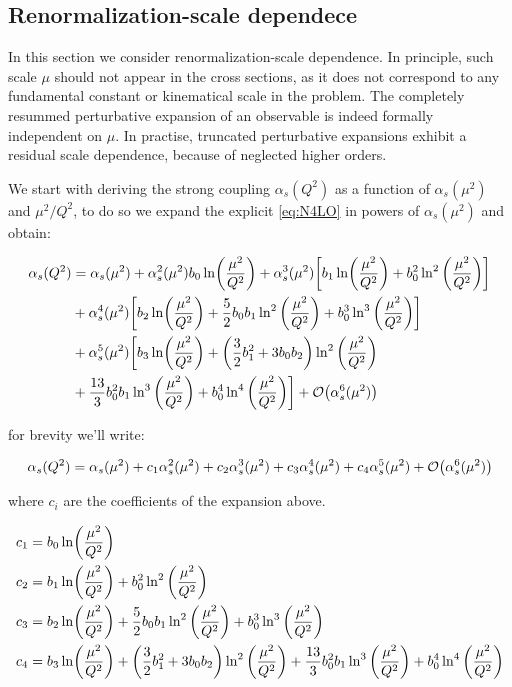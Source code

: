 \documentclass[../main.tex]{subfiles}
\begin{document}
\subsection{Renormalization-scale dependece} \label{subsec:Renormalization_scale_dependence}
In this section we consider renormalization-scale dependence. In principle, such scale $\mu$ should not appear in
the cross sections, as it does not correspond to any fundamental constant or kinematical scale in the problem.
The completely resummed perturbative expansion of an observable is indeed formally independent on $\mu$.
In practise, truncated perturbative expansions exhibit a residual scale dependence, because of neglected higher orders.

We start with deriving the strong coupling $\alpha_s (Q^2)$ as a function of $\alpha_s(\mu^2)$ and $\mu^2/Q^2$, to do so we expand 
the explicit \cref{eq:N4LO} in powers of $\alpha_s(\mu^2)$ and obtain:

\begin{align}
    \begin{split}\label{eq:renormalization scale dependence}
        \alpha_s(Q^2) &= \alpha_s(\mu^2) + \alpha_s^2(\mu^2) b_0 \ln(\frac{\mu^2}{Q^2}) + \alpha_s^3(\mu^2) \biggl[b_1 \ln(\frac{\mu^2}{Q^2}) + b_0^2 \ln^2\qty(\frac{\mu^2}{Q^2})\biggr] \\
        &+ \alpha_s^4 (\mu^2) \biggl[ b_2 \ln(\frac{\mu^2}{Q^2}) + \frac{5}{2} b_0 b_1 \ln^2\qty(\frac{\mu^2}{Q^2}) + b_0^3 \ln^3\qty(\frac{\mu^2}{Q^2})\biggr] \\
        &+ \alpha_s^5(\mu^2) \biggl[ b_3 \ln(\frac{\mu^2}{Q^2}) + \qty(\frac{3}{2} b_1^2 + 3 b_0 b_2 ) \ln^2\qty(\frac{\mu^2}{Q^2}) \\
        &+ \frac{13}{3} b_0^2 b_1 \ln^3\qty(\frac{\mu^2}{Q^2}) + b_0^4 \ln^4\qty(\frac{\mu^2}{Q^2}) \biggr] + \order{\alpha_s^6(\mu^2)}
    \end{split}
\end{align}

for brevity we'll write: 

\begin{equation}
    \alpha_s(Q^2) = \alpha_s(\mu^2) + c_1 \alpha_s^2(\mu^2) + c_2 \alpha_s^3(\mu^2) + c_3 \alpha_s^4(\mu^2) + c_4 \alpha_s^5(\mu^2) + \order{\alpha_s^6(\mu^2)} 
\end{equation}

where $c_i$ are the coefficients of the expansion above.

\begin{align}
    \begin{split}
        c_1 &= b_0 \ln(\frac{\mu^2}{Q^2}) \\
        c_2 &= b_1 \ln(\frac{\mu^2}{Q^2}) + b_0^2 \ln^2\qty(\frac{\mu^2}{Q^2}) \\
        c_3 &= b_2 \ln(\frac{\mu^2}{Q^2}) + \frac{5}{2} b_0 b_1 \ln^2\qty(\frac{\mu^2}{Q^2}) + b_0^3 \ln^3\qty(\frac{\mu^2}{Q^2}) \\
        c_4 &= b_3 \ln(\frac{\mu^2}{Q^2}) + \qty(\frac{3}{2} b_1^2 + 3 b_0 b_2 ) \ln^2\qty(\frac{\mu^2}{Q^2}) + \frac{13}{3} b_0^2 b_1 \ln^3\qty(\frac{\mu^2}{Q^2}) + b_0^4 \ln^4\qty(\frac{\mu^2}{Q^2})
    \end{split}
\end{align}
\end{document}
